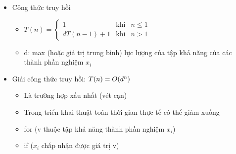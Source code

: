 \begin{itemize}
    \item Công thức truy hồi
        \begin{itemize}
            \item [] $
                    T(n) = \left\{\begin{array}{lcr}
                    1 & \text{khi} & n \leq 1\\
                    dT(n-1)+1 & \text{khi} & n > 1
                    \end{array} \right.
                   $
            \item [] d: max (hoặc giá trị trung bình) lực lượng của tập khả năng của các thành phần nghiệm $x_i$
        \end{itemize}
    
    \item Giải công thức truy hồi: $T(n) = O(d\sp{n})$
        \begin{itemize}
            \item Là trường hợp xấu nhất (vét cạn)
            \item Trong triển khai thuật toán thời gian thực tế có thể giảm xuống
            \item [] \qquad for (v thuộc tập khả năng thành phần nghiệm $x_i$)
            \item [] \qquad \qquad if ($x_i$ chấp nhận được giá trị v)
        \end{itemize}
\end{itemize}


